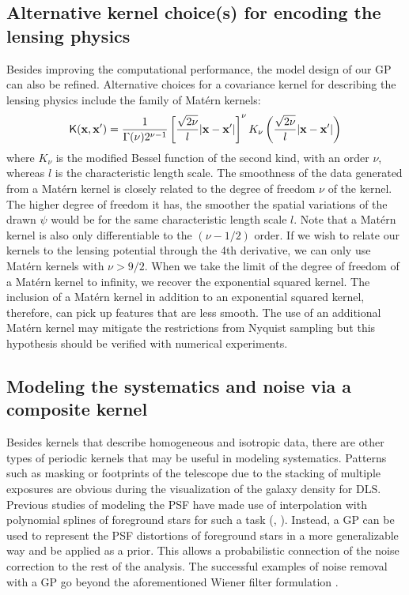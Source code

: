 \subsection{Alternative kernel choice(s) for encoding the lensing physics}
Besides improving the computational performance, the model design of our GP can
also be refined.
Alternative choices for a covariance kernel for describing the lensing physics 
include the family of Mat\'{e}rn kernels:
\begin{equation}
	\mathsf{K}(\mathbf{x}, \mathbf{x}') = \frac{1}{\Gamma(\nu)2^{\nu-1}}\left[
		\frac{\sqrt{2\nu}}{l}|\mathbf{x} - \mathbf{x}'|
	\right]^\nu K_\nu \left(\frac{\sqrt{2\nu}}{l}|\mathbf{x}-\mathbf{x}'|\right) 
\end{equation}
where $K_\nu$ is the modified Bessel function of the second kind, with an order
$\nu$, whereas $l$ is the characteristic length scale.
The smoothness of the data generated from a Mat\'{e}rn kernel is closely
related to the degree of freedom $\nu$ of the kernel. 
The higher degree of freedom it has, the smoother the spatial variations of the
drawn $\psi$ would be for the same characteristic length scale $l$.
Note that a Mat\'{e}rn kernel is also only differentiable to the $(\nu-1/2)$ order.
If we wish to relate our kernels to the lensing potential through the 4th
derivative, we can only use Mat\'{e}rn kernels with $\nu > 9/2$. 
When we take the limit of the degree of freedom of a Mat\'{e}rn kernel to infinity, 
we recover the exponential squared kernel. The inclusion of a Mat\'{e}rn kernel
in addition to an exponential squared kernel, therefore, can pick up features
that are less smooth. The use of an additional Mat\'{e}rn kernel may mitigate the
restrictions from Nyquist sampling but this hypothesis should be verified with
numerical experiments. 

 

\subsection{Modeling the systematics and noise via a composite kernel}
Besides kernels that describe homogeneous and isotropic data,
there are other types of periodic kernels that may be useful
in modeling systematics. 
Patterns such as masking or footprints of the telescope due to the
stacking of multiple exposures are obvious during the visualization of the
galaxy density for DLS. 
Previous studies of modeling the PSF
have made use of interpolation with polynomial splines of foreground stars 
for such a task (\citealt{Rowe2010},
\citealt{Jee2013a}).  Instead, a GP can be used to represent the PSF distortions
of foreground stars in a more generalizable way and be
applied as a prior. This allows a probabilistic connection of the noise correction to the rest of the
analysis. The successful examples of noise removal with a GP go beyond 
the aforementioned Wiener filter formulation \citep{Perez-Cruz2013}.

